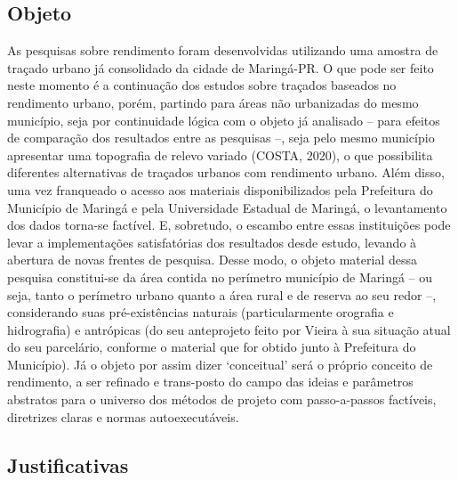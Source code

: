 \documentclass[twoside, 12pt, english,italian,latin,greek,french,spanish,brazil]{book}
\begin{document}
    \subsection{Objeto}


        As pesquisas sobre rendimento foram desenvolvidas utilizando uma amostra de traçado urbano já consolidado da cidade de Maringá-PR. O que pode ser feito neste momento é a continuação dos estudos sobre traçados baseados no rendimento urbano, porém, partindo para áreas não urbanizadas do mesmo município, seja por continuidade lógica com o objeto já analisado – para efeitos de comparação dos resultados entre as pesquisas –, seja pelo mesmo município apresentar uma topografia de relevo variado (COSTA, 2020), o que possibilita diferentes alternativas de traçados urbanos com rendimento urbano. Além disso, uma vez franqueado o acesso aos materiais disponibilizados pela Prefeitura do Município de Maringá e pela Universidade Estadual de Maringá, o levantamento dos dados torna-se factível. E, sobretudo, o escambo entre essas instituições pode levar a implementações satisfatórias dos resultados desde estudo, levando à abertura de novas frentes de pesquisa. Desse modo, o objeto material dessa pesquisa constitui-se da área contida no perímetro município de Maringá – ou seja, tanto o perímetro urbano quanto a área rural e de reserva ao seu redor –, considerando suas pré-existências naturais (particularmente orografia e hidrografia) e antrópicas (do seu anteprojeto feito por Vieira à sua situação atual do seu parcelário, conforme o material que for obtido junto à Prefeitura do Município). Já o objeto por assim dizer ‘conceitual’ será o próprio conceito de rendimento, a ser refinado e trans-posto do campo das ideias e parâmetros abstratos para o universo dos métodos de projeto com passo-a-passos factíveis, diretrizes claras e normas autoexecutáveis.

    \subsection{Justificativas}

\end{document}
